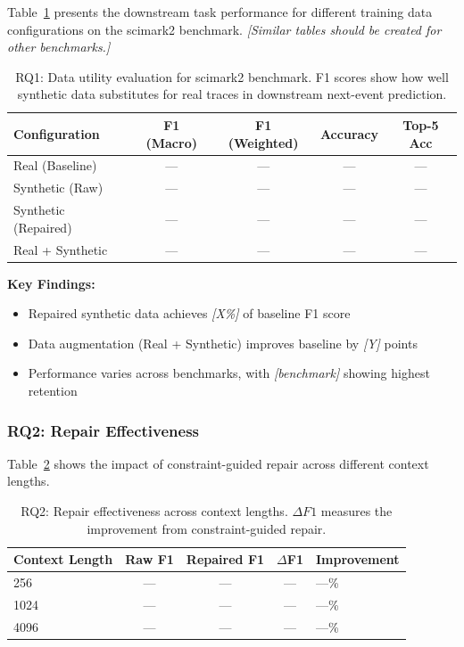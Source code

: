 Table~\ref{tab:rq1_results} presents the downstream task performance for different training data configurations on the scimark2 benchmark. \textit{[Similar tables should be created for other benchmarks.]}

\begin{table}[h]
\centering
\caption{RQ1: Data utility evaluation for scimark2 benchmark. F1 scores show how well synthetic data substitutes for real traces in downstream next-event prediction.}
\label{tab:rq1_results}
\begin{tabular}{@{}lcccc@{}}
\toprule
\textbf{Configuration} & \textbf{F1 (Macro)} & \textbf{F1 (Weighted)} & \textbf{Accuracy} & \textbf{Top-5 Acc} \\
\midrule
Real (Baseline)          & --- & --- & --- & --- \\
Synthetic (Raw)          & --- & --- & --- & --- \\
Synthetic (Repaired)     & --- & --- & --- & --- \\
Real + Synthetic         & --- & --- & --- & --- \\
\bottomrule
\end{tabular}
\end{table}

\textbf{Key Findings:}
\begin{itemize}
    \item Repaired synthetic data achieves \textit{[X\%]} of baseline F1 score
    \item Data augmentation (Real + Synthetic) improves baseline by \textit{[Y]} points
    \item Performance varies across benchmarks, with \textit{[benchmark]} showing highest retention
\end{itemize}

\subsubsection{RQ2: Repair Effectiveness}

Table~\ref{tab:rq2_results} shows the impact of constraint-guided repair across different context lengths.

\begin{table}[h]
\centering
\caption{RQ2: Repair effectiveness across context lengths. \(\Delta F1\) measures the improvement from constraint-guided repair.}
\label{tab:rq2_results}
\begin{tabular}{@{}lcccl@{}}
\toprule
\textbf{Context Length} & \textbf{Raw F1} & \textbf{Repaired F1} & \textbf{\(\Delta\)F1} & \textbf{Improvement} \\
\midrule
256         & --- & --- & --- & ---\% \\
1024        & --- & --- & --- & ---\% \\
4096        & --- & --- & --- & ---\% \\
\bottomrule
\end{tabular}
\end{table}

